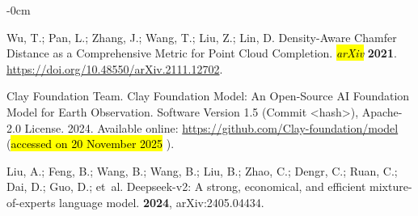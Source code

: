 \documentclass[remotesensing,article,accept,pdftex,moreauthors]{Definitions/mdpi}
\begin{document}
\begin{adjustwidth}{-\extralength}{0cm}
\begin{thebibliography}{999}
Wu, T.; Pan, L.; Zhang, J.; Wang, T.; Liu, Z.; Lin, D.
\newblock Density-Aware Chamfer Distance as a Comprehensive Metric for Point
  Cloud Completion. \emph{\hl{arXiv} %
}  \textbf{2021}.
  {\url{https://doi.org/10.48550/arXiv.2111.12702}}.

{Clay Foundation Team}.
\newblock Clay Foundation Model: An Open-Source AI Foundation Model for Earth
  Observation. Software Version 1.5 (Commit <hash>), Apache-2.0 License. 2024. Available online:
\newblock \url{https://github.com/Clay-foundation/model} (\hl{accessed on 20 November 2025}%
).

Liu, A.; Feng, B.; Wang, B.; Wang, B.; Liu, B.; Zhao, C.; Dengr, C.; Ruan, C.;
  Dai, D.; Guo, D.;  et~al.
\newblock Deepseek-v2: A strong, economical, and efficient mixture-of-experts
  language model.
 {\bf 2024}, arXiv:2405.04434.

\end{thebibliography}

  \PublishersNote{}
  \end{adjustwidth}

\end{document}
